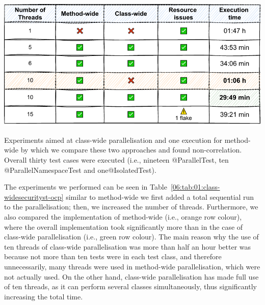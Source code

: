 \begin{table}[ht!]
    \centering
    \includegraphics[scale=0.8]{obrazky-figures/08-experiments/preliminary/06-exp-preliminary-cluster-wide-ocp}
    \caption{Experiments aimed at class-wide parallelisation and one execution for method-wide by which we compare these
    two approaches and found non-correlation. Overall thirty test cases were executed (i.e., nineteen @ParallelTest,
        ten @ParallelNamespaceTest and one@IsolatedTest).
    }
    \label{06:tab:01:class-widesecurityst-ocp}
\end{table}

The experiments we performed can be seen in Table~\ref{06:tab:01:class-widesecurityst-ocp} similar to method-wide
we first added a total sequential run to the parallelisation;
then, we increased the number of threads.
Furthermore, we also compared the implementation of method-wide (i.e., orange row colour), where the overall implementation took
significantly more than in the case of class-wide parallelisation (i.e., green row colour).
The main reason why the use of ten threads of class-wide parallelisation was more than half an hour better was because
not more than ten tests were in each test class, and therefore unnecessarily, many threads were used in method-wide parallelisation,
which were not actually used.
On the other hand, class-wide parallelisation has made full use of ten threads, as it can perform several classes simultaneously,
thus significantly increasing the total time.



